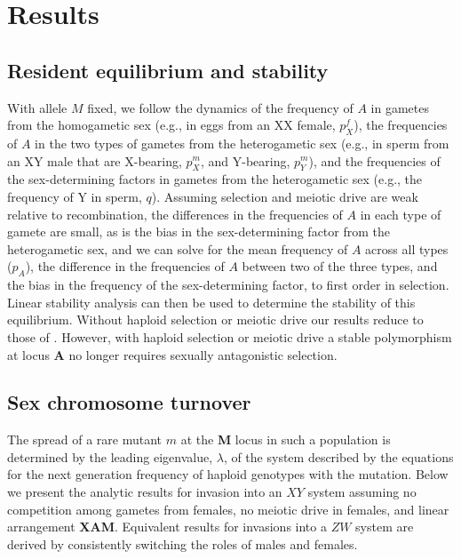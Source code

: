 \documentclass[12pt]{article}
\begin{document}
\section*{Results}

\subsection*{Resident equilibrium and stability}
With allele $M$ fixed, we follow the dynamics of the frequency of $A$ in gametes from the homogametic sex (e.g., in eggs from an XX female, $p^f_X$), the frequencies of $A$ in the two types of gametes from the heterogametic sex (e.g., in sperm from an XY male that are X-bearing, $p^m_X$, and Y-bearing, $p^m_Y$), and the frequencies of the sex-determining factors in gametes from the heterogametic sex (e.g., the frequency of Y in sperm, $q$).
Assuming selection and meiotic drive are weak relative to recombination, the differences in the frequencies of $A$ in each type of gamete are small, as is the bias in the sex-determining factor from the heterogametic sex, and we can solve for the mean frequency of $A$ across all types ($p_A$), the difference in the frequencies of $A$ between two of the three types, and the bias in the frequency of the sex-determining factor, to first order in selection.
Linear stability analysis can then be used to determine the stability of this equilibrium.
Without haploid selection or meiotic drive our results reduce to those of \cite{vanDoorn:2007eu}. %
However, with haploid selection or meiotic drive a stable polymorphism at locus \textbf{A} no longer requires sexually antagonistic selection. %

\subsection*{Sex chromosome turnover}
The spread of a rare mutant $m$ at the \textbf{M} locus in such a population is determined by the leading eigenvalue, $\lambda$, of the system described by the equations for the next generation frequency of haploid genotypes with the mutation. %
Below we present the analytic results for invasion into an $XY$ system assuming no competition among gametes from females, no meiotic drive in females, and linear arrangement \textbf{X}\textbf{A}\textbf{M}. %
Equivalent results for invasions into a $ZW$ system are derived by consistently switching the roles of males and females. %
\end{document}

